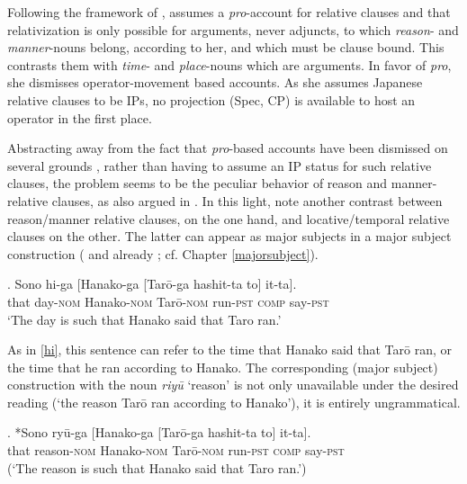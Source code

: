 \documentclass [output=book,colorlinks,citecolor=brown]{langscibook}
\begin{document}
Following the framework of \citet{lasnik:1992:move}, \citet[ch. 3.4]{murasugi:1991:noun} assumes a \textit{pro}-account for relative clauses and that relativization is only possible for arguments, never adjuncts, to which \textit{reason}- and \textit{manner}-nouns belong, according to her, and which must be clause bound. This contrasts them with \textit{time}- and \textit{place}-nouns which are arguments. In favor of \textit{pro}, she dismisses operator-movement based accounts. As she assumes Japanese relative clauses to be IPs, no projection (Spec, CP) is available to host an operator in the first place.

Abstracting away from the fact that \textit{pro}-based accounts have been dismissed on several grounds \citep[36–37]{salzmann:2017:reconstruction}, rather than having to assume an IP status for such relative clauses, the problem seems to be the peculiar behavior of reason and manner-relative clauses, as also argued in \citet{miyamoto:2017:RC}. In this light, note another contrast between reason/manner relative clauses, on the one hand, and locative/temporal relative clauses on the other. The latter can appear as major subjects in a major subject construction (\citealt{kuroda:1992:japanese} and already \citealt{kuno:1973:structure}; cf. Chapter \ref{majorsubject}). %

\newpage

\exg. Sono hi-ga [Hanako-ga [Tarō-ga hashit-ta to] it-ta].\\
that day-\textsc{nom} Hanako-\textsc{nom} Tarō-\textsc{nom} run-\textsc{pst} \textsc{comp} say-\textsc{pst}\\
`The day is such that Hanako said that Taro ran.' \\ \null \hfill \citep[628]{miyamoto:2017:RC} \label{sono hi}

As in \ref{hi}, this sentence can refer to the time that Hanako said that Tarō ran, or the time that he ran according to Hanako. The corresponding (major subject) construction with the noun \textit{riyū} `reason' is not only unavailable under the desired reading (`the reason Tarō ran according to Hanako’), it is entirely ungrammatical.


\exg. *Sono ryū-ga [Hanako-ga [Tarō-ga hashit-ta to] it-ta].\\
that reason-\textsc{nom} Hanako-\textsc{nom} Tarō-\textsc{nom} run-\textsc{pst} \textsc{comp} say-\textsc{pst}\\
(`The reason is such that Hanako said that Taro ran.’) \\ \null \hfill \citep[628]{miyamoto:2017:RC}
\end{document}
